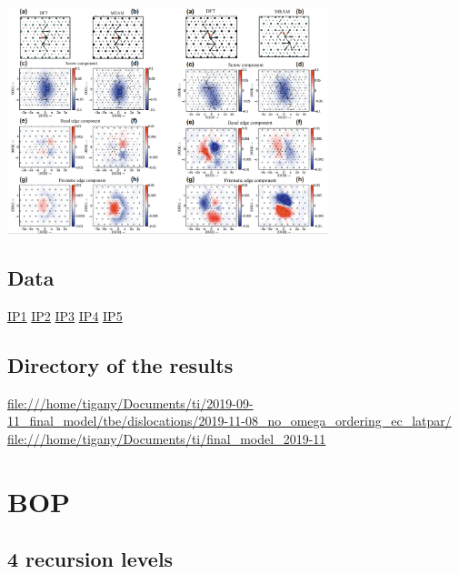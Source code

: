 \documentclass[11pt]{article}
\begin{document}
\begin{center}
\includegraphics[width=0.7\textwidth]{Images/ghazisaiedi-trinkle-scew-dislocation-core-prism-symm-asymm.png}
\end{center}





\subsection{Data}
\label{sec:org44d533d}
\href{file:///home/tigany/Documents/ti/final\_model\_2019-11-12/results\_2019-11-09\_muc/IP1-oo\_19-11-09--04-46-00.log}{IP1}
\href{file:///home/tigany/Documents/ti/final\_model\_2019-11-12/results\_2019-11-09\_muc/IP2-oo\_19-11-09--04-46-00.log}{IP2}
\href{file:///home/tigany/Documents/ti/final\_model\_2019-11-12/results\_2019-11-09\_muc/IP3-oo\_19-11-09--04-46-00.log}{IP3}
\href{file:///home/tigany/Documents/ti/final\_model\_2019-11-12/results\_2019-11-09\_muc/IP4-oo\_19-11-09--04-46-00.log}{IP4}
\href{file:///home/tigany/Documents/ti/final\_model\_2019-11-12/results\_2019-11-09\_muc/IP5-oo\_19-11-09--04-46-00.log}{IP5}

\subsection{Directory of the results}
\label{sec:org3440582}
\url{file:///home/tigany/Documents/ti/2019-09-11\_final\_model/tbe/dislocations/2019-11-08\_no\_omega\_ordering\_ec\_latpar/}
\url{file:///home/tigany/Documents/ti/final\_model\_2019-11}

\section{BOP}
\label{sec:org921f55b}

\subsection{4 recursion levels}
\label{sec:org0ad756e}
\end{document}
